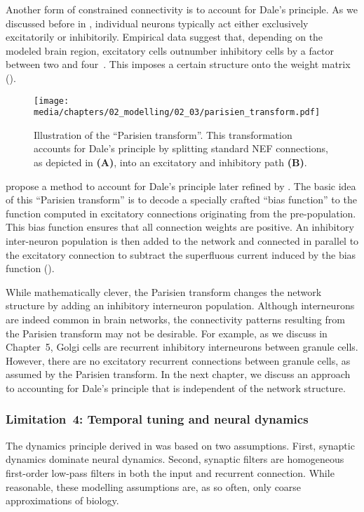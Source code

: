 Another form of constrained connectivity is to account for Dale's principle.
As we discussed before in , individual neurons typically act either exclusively excitatorily or inhibitorily. Empirical data suggest that, depending on the modeled brain region, excitatory cells outnumber inhibitory cells by a factor between two and four~\citep{hendry1981sizes,gabbott1986quantitative}.
This imposes a certain structure onto the weight matrix ().

\begin{figure}
	\centering
	\texttt{[image: media/chapters/02\_modelling/02\_03/parisien\_transform.pdf]}
	\caption[Illustration of the \enquote{Parisien transform}]{Illustration of the \enquote{Parisien transform}. This transformation accounts for Dale's principle by splitting standard NEF connections, as depicted in \textbf{(A)}, into an excitatory and inhibitory path \textbf{(B)}.}
	\label{fig:parisien_transform}
\end{figure}

 propose a method to account for Dale's principle later refined by \citet{parisien2008solving}.
The basic idea of this \enquote{Parisien transform} is to decode a specially crafted \enquote{bias function} to the function computed in excitatory connections originating from the pre-population.
This bias function ensures that all connection weights are positive.
An inhibitory inter-neuron population is then added to the network and connected in parallel to the excitatory connection to subtract the superfluous current induced by the bias function ().

While mathematically clever, the Parisien transform changes the network structure by adding an inhibitory interneuron population.
Although interneurons are indeed common in brain networks, the connectivity patterns resulting from the Parisien transform may not be desirable.
For example, as we discuss in Chapter~5, Golgi cells are recurrent inhibitory interneurons between granule cells.
However, there are no excitatory recurrent connections between granule cells, as assumed by the Parisien transform.
In the next chapter, we discuss an approach to accounting for Dale's principle that is independent of the network structure.

\subsubsection{Limitation~4: Temporal tuning and neural dynamics}
The dynamics principle derived in  was based on two assumptions.
First, synaptic dynamics dominate neural dynamics.
Second, synaptic filters are homogeneous first-order low-pass filters in both the input and recurrent connection.
While reasonable, these modelling assumptions are, as so often, only coarse approximations of biology.


